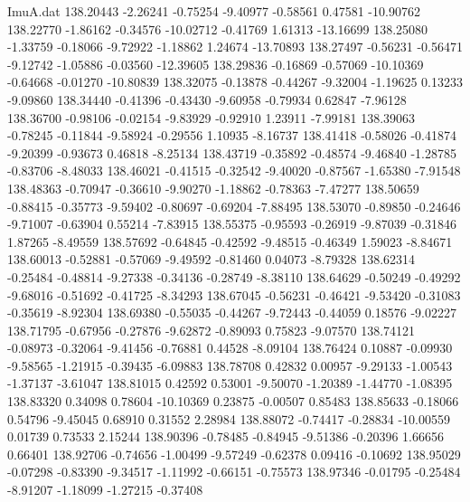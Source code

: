 \begin{filecontents}{ImuA.dat}
 138.20443   -2.26241   -0.75254   -9.40977   -0.58561    0.47581  -10.90762
 138.22770   -1.86162   -0.34576  -10.02712   -0.41769    1.61313  -13.16699
 138.25080   -1.33759   -0.18066   -9.72922   -1.18862    1.24674  -13.70893
 138.27497   -0.56231   -0.56471   -9.12742   -1.05886   -0.03560  -12.39605
 138.29836   -0.16869   -0.57069  -10.10369   -0.64668   -0.01270  -10.80839
 138.32075   -0.13878   -0.44267   -9.32004   -1.19625    0.13233   -9.09860
 138.34440   -0.41396   -0.43430   -9.60958   -0.79934    0.62847   -7.96128
 138.36700   -0.98106   -0.02154   -9.83929   -0.92910    1.23911   -7.99181
 138.39063   -0.78245   -0.11844   -9.58924   -0.29556    1.10935   -8.16737
 138.41418   -0.58026   -0.41874   -9.20399   -0.93673    0.46818   -8.25134
 138.43719   -0.35892   -0.48574   -9.46840   -1.28785   -0.83706   -8.48033
 138.46021   -0.41515   -0.32542   -9.40020   -0.87567   -1.65380   -7.91548
 138.48363   -0.70947   -0.36610   -9.90270   -1.18862   -0.78363   -7.47277
 138.50659   -0.88415   -0.35773   -9.59402   -0.80697   -0.69204   -7.88495
 138.53070   -0.89850   -0.24646   -9.71007   -0.63904    0.55214   -7.83915
 138.55375   -0.95593   -0.26919   -9.87039   -0.31846    1.87265   -8.49559
 138.57692   -0.64845   -0.42592   -9.48515   -0.46349    1.59023   -8.84671
 138.60013   -0.52881   -0.57069   -9.49592   -0.81460    0.04073   -8.79328
 138.62314   -0.25484   -0.48814   -9.27338   -0.34136   -0.28749   -8.38110
 138.64629   -0.50249   -0.49292   -9.68016   -0.51692   -0.41725   -8.34293
 138.67045   -0.56231   -0.46421   -9.53420   -0.31083   -0.35619   -8.92304
 138.69380   -0.55035   -0.44267   -9.72443   -0.44059    0.18576   -9.02227
 138.71795   -0.67956   -0.27876   -9.62872   -0.89093    0.75823   -9.07570
 138.74121   -0.08973   -0.32064   -9.41456   -0.76881    0.44528   -8.09104
 138.76424    0.10887   -0.09930   -9.58565   -1.21915   -0.39435   -6.09883
 138.78708    0.42832    0.00957   -9.29133   -1.00543   -1.37137   -3.61047
 138.81015    0.42592    0.53001   -9.50070   -1.20389   -1.44770   -1.08395
 138.83320    0.34098    0.78604  -10.10369    0.23875   -0.00507    0.85483
 138.85633   -0.18066    0.54796   -9.45045    0.68910    0.31552    2.28984
 138.88072   -0.74417   -0.28834  -10.00559    0.01739    0.73533    2.15244
 138.90396   -0.78485   -0.84945   -9.51386   -0.20396    1.66656    0.66401
 138.92706   -0.74656   -1.00499   -9.57249   -0.62378    0.09416   -0.10692
 138.95029   -0.07298   -0.83390   -9.34517   -1.11992   -0.66151   -0.75573
 138.97346   -0.01795   -0.25484   -8.91207   -1.18099   -1.27215   -0.37408

\end{filecontents}
